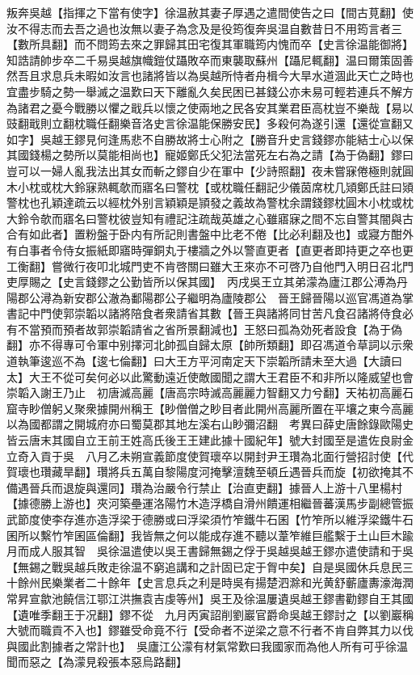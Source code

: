 叛奔吳越【指揮之下當有使字】徐温赦其妻子厚遇之遣間使告之曰【間古莧翻】使汝不得志而去吾之過也汝無以妻子為念及是役筠復奔吳温自數昔日不用筠言者三【數所具翻】而不問筠去來之罪歸其田宅復其軍職筠内愧而卒【史言徐温能御將】知誥請帥步卒二千易吳越旗幟鎧仗躡敗卒而東襲取蘇州【躡尼輒翻】温曰爾策固善然吾且求息兵未暇如汝言也諸將皆以為吳越所恃者舟楫今大旱水道涸此天亡之時也宜盡步騎之勢一舉滅之温歎曰天下離亂久矣民困已甚錢公亦未易可輕若連兵不解方為諸君之憂今戰勝以懼之戢兵以懷之使兩地之民各安其業君臣高枕豈不樂哉【易以豉翻戢則立翻枕職任翻樂音洛史言徐温能保勝安民】多殺何為遂引還【還從宣翻又如字】吳越王鏐見何逢馬悲不自勝故將士心附之【勝音升史言錢鏐亦能結士心以保其國錢楊之勢所以莫能相尚也】寵姬鄭氏父犯法當死左右為之請【為于偽翻】鏐曰豈可以一婦人亂我法出其女而斬之鏐自少在軍中【少詩照翻】夜未嘗寐倦極則就圓木小枕或枕大鈴寐熟輒欹而寤名曰警枕【或枕職任翻記少儀茵席枕几熲鄭氏註曰熲警枕也孔穎達疏云以經枕外别言穎穎是頴發之義故為警枕余謂錢鏐枕圓木小枕或枕大鈴令欹而寤名曰警枕彼豈知有禮記注疏哉英雄之心雖寤寐之間不忘自警其闇與古合有如此者】置粉盤于卧内有所記則書盤中比老不倦【比必利翻及也】或寢方酣外有白事者令侍女振紙即寤時彈銅丸于樓牆之外以警直更者【直更者即持更之卒也更工衡翻】嘗微行夜叩北城門吏不肯啓關曰雖大王來亦不可啓乃自他門入明日召北門吏厚賜之【史言錢鏐之公勤皆所以保其國】　丙戌吳王立其弟濛為廬江郡公溥為丹陽郡公潯為新安郡公澈為鄱陽郡公子繼明為廬陵郡公　晉王歸晉陽以巡官馮道為掌書記中門使郭崇韜以諸將陪食者衆請省其數【晉王與諸將同甘苦凡食召諸將侍食必有不當預而預者故郭崇韜請省之省所景翻減也】王怒曰孤為効死者設食【為于偽翻】亦不得專可令軍中别擇河北帥孤自歸太原【帥所類翻】即召馮道令草詞以示衆道執筆逡巡不為【逡七倫翻】曰大王方平河南定天下崇韜所請未至大過【大讀曰太】大王不從可矣何必以此驚動遠近使敵國聞之謂大王君臣不和非所以隆威望也會崇韜入謝王乃止　初唐滅高麗【唐高宗時滅高麗麗力智翻又力兮翻】天祐初高麗石窟寺眇僧躬乂聚衆據開州稱王【眇僧僧之眇目者此開州高麗所置在平壤之東今高麗以為國都謂之開城府亦曰蜀莫郡其地左溪右山眇彌沼翻　考異曰薛史唐餘錄歐陽史皆云唐末其國自立王前王姓高氏後王王建此據十國紀年】號大封國至是遣佐良尉金立奇入貢于吳　八月乙未朔宣義節度使賀瓌卒以開封尹王瓚為北面行營招討使【代賀瓌也瓚藏旱翻】瓚將兵五萬自黎陽度河掩擊澶魏至頓丘遇晉兵而旋【初欲掩其不備遇晉兵而退旋與還同】瓚為治嚴令行禁止【治直吏翻】據晉人上游十八里楊村【據德勝上游也】夾河築壘運洛陽竹木造浮橋自滑州饋運相繼晉蕃漢馬步副總管振武節度使李存進亦造浮梁于德勝或曰浮梁須竹笮鐵牛石囷【竹笮所以維浮梁鐵牛石囷所以繫竹笮囷區倫翻】我皆無之何以能成存進不聽以葦笮維巨艦繫于土山巨木踰月而成人服其智　吳徐温遣使以吳王書歸無錫之俘于吳越吳越王鏐亦遣使請和于吳【無錫之戰吳越兵敗走徐温不窮追講和之計固已定于胷中矣】自是吳國休兵息民三十餘州民樂業者二十餘年【史言息兵之利是時吳有揚楚泗滁和光黄舒蘄廬夀濠海潤常昇宣歙池饒信江鄂江洪撫袁吉虔等州】吳王及徐温屢遺吳越王鏐書勸鏐自王其國【遺唯季翻王于况翻】鏐不從　九月丙寅詔削劉巖官爵命吳越王鏐討之【以劉巖稱大號而職貢不入也】鏐雖受命竟不行【受命者不逆梁之意不行者不肯自弊其力以伐與國此割據者之常計也】　吳廬江公濛有材氣常歎曰我國家而為他人所有可乎徐温聞而惡之【為濛見殺張本惡烏路翻】

